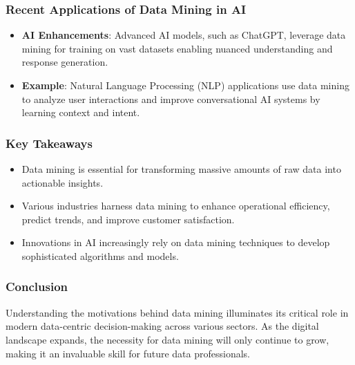 \documentclass[aspectratio=169]{beamer}
\begin{document}
\begin{frame}[fragile]
    \frametitle{Recent Applications of Data Mining in AI}
    \begin{itemize}
        \item \textbf{AI Enhancements}: Advanced AI models, such as ChatGPT, leverage data mining for training on vast datasets enabling nuanced understanding and response generation.
        \item \textbf{Example}: Natural Language Processing (NLP) applications use data mining to analyze user interactions and improve conversational AI systems by learning context and intent.
    \end{itemize}
\end{frame}

\begin{frame}[fragile]
    \frametitle{Key Takeaways}
    \begin{itemize}
        \item Data mining is essential for transforming massive amounts of raw data into actionable insights.
        \item Various industries harness data mining to enhance operational efficiency, predict trends, and improve customer satisfaction.
        \item Innovations in AI increasingly rely on data mining techniques to develop sophisticated algorithms and models.
    \end{itemize}
\end{frame}

\begin{frame}[fragile]
    \frametitle{Conclusion}
    Understanding the motivations behind data mining illuminates its critical role in modern data-centric decision-making across various sectors. As the digital landscape expands, the necessity for data mining will only continue to grow, making it an invaluable skill for future data professionals.
\end{frame}
\end{document}

